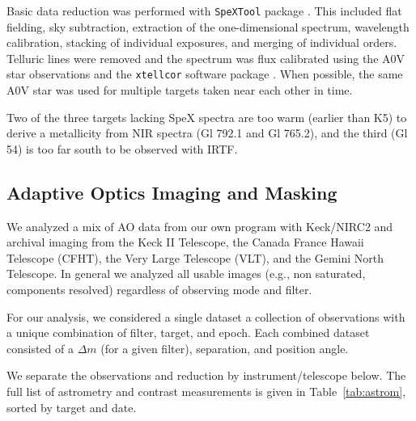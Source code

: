 \documentclass[twocolumn]{aastex62}
\begin{document}
Basic data reduction was performed with {\tt SpeXTool} package \citep{Cushing2004}. This included flat fielding, sky subtraction, extraction of the one-dimensional spectrum, wavelength calibration, stacking of individual exposures, and merging of individual orders. Telluric lines were removed and the spectrum was flux calibrated using the A0V star observations and the {\tt xtellcor} software package \citep{Vacca2003}. When possible, the same A0V star was used for multiple targets taken near each other in time. 

Two of the three targets lacking SpeX spectra are too warm (earlier than K5) to derive a metallicity from NIR spectra (Gl 792.1 and Gl 765.2), and the third (Gl 54) is too far south to be observed with IRTF. 

\subsection{Adaptive Optics Imaging and Masking}\label{sec:ao}

We analyzed a mix of AO data from our own program with Keck/NIRC2 and archival imaging from the Keck II Telescope, the Canada France Hawaii Telescope (CFHT), the Very Large Telescope (VLT), and the Gemini North Telescope. In general we analyzed all usable images (e.g., non saturated, components resolved) regardless of observing mode and filter. 

For our analysis, we considered a single dataset a collection of observations with a unique combination of filter, target, and epoch. Each combined dataset consisted of a $\Delta m$ (for a given filter), separation, and position angle. 

We separate the observations and reduction by instrument/telescope below. The full list of astrometry and contrast measurements is given in Table~\ref{tab:astrom}, sorted by target and date. 

\end{document}
